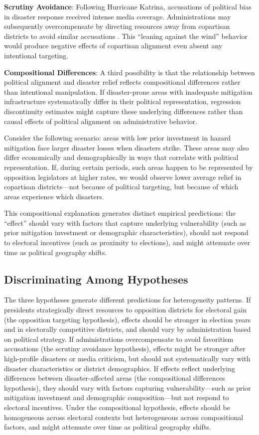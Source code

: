 \documentclass[12pt,letterpaper,oneside]{book}
\begin{document}
\textbf{Scrutiny Avoidance}: Following Hurricane Katrina, accusations of political bias in disaster response received intense media coverage. Administrations may subsequently overcompensate by directing resources away from copartisan districts to avoid similar accusations \citep{besley2006handcuffs}. This ``leaning against the wind'' behavior would produce negative effects of copartisan alignment even absent any intentional targeting.

\textbf{Compositional Differences}: A third possibility is that the relationship between political alignment and disaster relief reflects compositional differences rather than intentional manipulation. If disaster-prone areas with inadequate mitigation infrastructure systematically differ in their political representation, regression discontinuity estimates might capture these underlying differences rather than causal effects of political alignment on administrative behavior.

Consider the following scenario: areas with low prior investment in hazard mitigation face larger disaster losses when disasters strike. These areas may also differ economically and demographically in ways that correlate with political representation. If, during certain periods, such areas happen to be represented by opposition legislators at higher rates, we would observe lower average relief in copartisan districts---not because of political targeting, but because of which areas experience which disasters.

This compositional explanation generates distinct empirical predictions: the ``effect'' should vary with factors that capture underlying vulnerability (such as prior mitigation investment or demographic characteristics), should not respond to electoral incentives (such as proximity to elections), and might attenuate over time as political geography shifts.

\subsection{Discriminating Among Hypotheses}

The three hypotheses generate different predictions for heterogeneity patterns. If presidents strategically direct resources to opposition districts for electoral gain (the opposition targeting hypothesis), effects should be stronger in election years and in electorally competitive districts, and should vary by administration based on political strategy. If administrations overcompensate to avoid favoritism accusations (the scrutiny avoidance hypothesis), effects might be stronger after high-profile disasters or media criticism, but should not systematically vary with disaster characteristics or district demographics. If effects reflect underlying differences between disaster-affected areas (the compositional differences hypothesis), they should vary with factors capturing vulnerability---such as prior mitigation investment and demographic composition---but not respond to electoral incentives. Under the compositional hypothesis, effects should be homogeneous across electoral contexts but heterogeneous across compositional factors, and might attenuate over time as political geography shifts.
\end{document}
